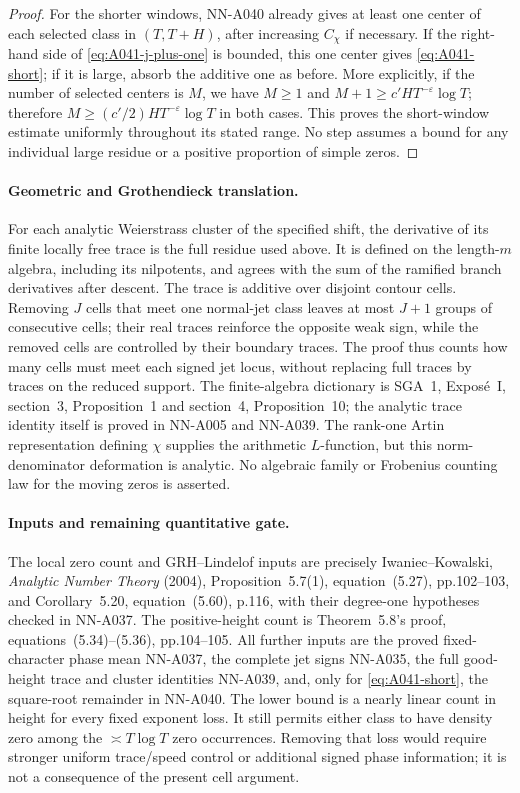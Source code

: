 \begin{proof}
For the shorter windows, NN-A040 already gives at least one
center of each selected class in $(T,T+H)$, after increasing
$C_\chi$ if necessary. If the right-hand side of
\eqref{eq:A041-j-plus-one} is bounded, this one center gives
\eqref{eq:A041-short}; if it is large, absorb the additive one
as before. More explicitly, if the number of selected centers
is $M$, we have $M\ge1$ and $M+1\ge c'HT^{-\varepsilon}\log T$;
therefore $M\ge(c'/2)HT^{-\varepsilon}\log T$ in both cases.
This proves the short-window estimate uniformly throughout its
stated range. No step assumes a bound for any individual large
residue or a positive proportion of simple zeros.
\end{proof}

\paragraph{Geometric and Grothendieck translation.}
For each analytic Weierstrass cluster of the specified shift,
the derivative of its finite locally free trace is the full
residue used above. It is defined on the length-$m$ algebra,
including its nilpotents, and agrees with the sum of the
ramified branch derivatives after descent. The trace is additive
over disjoint contour cells. Removing $J$ cells that meet one
normal-jet class leaves at most $J+1$ groups of consecutive cells;
their real traces reinforce the opposite weak sign, while the
removed cells are controlled by their boundary traces. The
proof thus counts how many cells must meet each signed jet locus,
without replacing full traces by traces on the reduced support.
The finite-algebra dictionary is SGA~1, Expos\'e~I, section~3,
Proposition~1 and section~4, Proposition~10; the analytic trace
identity itself is proved in NN-A005 and NN-A039. The rank-one
Artin representation defining $\chi$ supplies the arithmetic
$L$-function, but this norm-denominator deformation is analytic.
No algebraic family or Frobenius counting law for the moving
zeros is asserted.

\paragraph{Inputs and remaining quantitative gate.}
The local zero count and GRH--Lindelof inputs are precisely
Iwaniec--Kowalski, \emph{Analytic Number Theory} (2004),
Proposition~5.7(1), equation~(5.27), pp.102--103, and
Corollary~5.20, equation~(5.60), p.116, with their degree-one
hypotheses checked in NN-A037. The positive-height count is
Theorem~5.8's proof, equations~(5.34)--(5.36), pp.104--105.
All further inputs are the proved fixed-character phase mean
NN-A037, the complete jet signs NN-A035, the full good-height
trace and cluster identities NN-A039, and, only for
\eqref{eq:A041-short}, the square-root remainder in NN-A040.
The lower bound is a nearly linear count in height for every
fixed exponent loss. It still permits either class to have
density zero among the $\asymp T\log T$ zero occurrences.
Removing that loss would require stronger uniform trace/speed
control or additional signed phase information; it is not a
consequence of the present cell argument.


